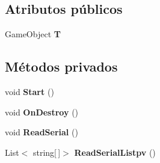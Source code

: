 \subsection*{Atributos públicos}
\begin{DoxyCompactItemize}
\item 
\mbox{\label{class_serial_controller_aad00abcbceab09c819dc5d39bcf7c4b7}} 
Game\+Object {\bfseries T}
\end{DoxyCompactItemize}
\subsection*{Métodos privados}
\begin{DoxyCompactItemize}
\item 
\mbox{\label{class_serial_controller_aa7b95b820dcecb35da4063bb7a133f0c}} 
void {\bfseries Start} ()
\item 
\mbox{\label{class_serial_controller_aae2c02011c1c770ccceea6cef7e36253}} 
void {\bfseries On\+Destroy} ()
\item 
\mbox{\label{class_serial_controller_abf82fcc215b931c8ab412e3e91e6023a}} 
void {\bfseries Read\+Serial} ()
\item 
\mbox{\label{class_serial_controller_a8d6e5eecbdad9b447a15f1364b28ab1c}} 
List$<$ string\mbox{[}$\,$\mbox{]}$>$ {\bfseries Read\+Serial\+Listpv} ()
\end{DoxyCompactItemize}
